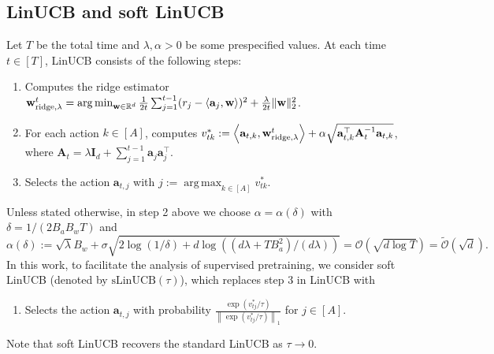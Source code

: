 \documentclass[10pt]{article}
\newcommand{\id}{\bI}
\DeclareMathOperator*{\argmin}{arg\,min}
\DeclareMathOperator*{\argmax}{arg\,max}
\newcommand{\norm}[1]{\left\|{#1}\right\|}
\newcommand{\lone}[1]{\norm{#1}_1}
\renewcommand{\cO}{\mathcal{O}}
\newcommand{\<}{\left\langle}
\renewcommand{\>}{\right\rangle}
\newcommand{\ridge}{{\rm ridge}}
\newcommand{\R}{\mathbb{R}}
\newcommand{\sLinUCB}{{\mathrm{sLinUCB}}}
\newcommand{\temp}{{\tau}}
\newcommand{\cwid}{{\alpha}}
\newcommand{\tcO}{{\tilde{\mathcal O}}}
\newcommand{\totlen}{{T}}
\def\bA{{\mathbf A}}
\def\bI{{\mathbf I}}
\def\ba{{\mathbf a}}
\def\bw{{\mathbf w}}
\begin{document}
\subsection{LinUCB and soft LinUCB}\label{sec:soft-LinUCB}
Let $T$ be the total time and $\lambda,\cwid>0$ be some prespecified values. At each time $t\in[T]$, LinUCB consists of the following steps:
\begin{enumerate}
    \item Computes the ridge estimator $\bw^t_{\ridge,\lambda}=\argmin_{\bw\in\R^d}\frac{1}{2t}\sum_{j=1}^{t-1}(r_j-\<\ba_j,\bw\>)^2+\frac{\lambda}{2t}\|\bw\|_2^2$.
    \item For each action $k\in[A]$, computes $v^*_{tk}:=\<\ba_{t,k},\bw^t_{\ridge,\lambda}\>+\cwid\sqrt{\ba_{t,k}^\top \bA_{t}^{-1}  \ba_{t,k}}$, where $\bA_t=\lambda\id_d+\sum_{j=1}^{t-1}\ba_j\ba_j^\top$.
    \item Selects the action $\ba_{t,j}$ with $j:=\argmax_{k\in[A]}v^*_{tk}$.
\end{enumerate}
Unless stated otherwise, in step 2 above we choose $\alpha=\alpha(\delta)$ with $\delta=1/(2B_aB_wT)$ and $$\cwid(\delta):=\sqrt{\lambda}B_w+\sigma\sqrt{2\log(1/\delta)+d\log((d\lambda+TB_a^2)/(d\lambda))}=\cO(\sqrt{d\log \totlen})=\tcO(\sqrt{d}).$$
In this work, to facilitate the analysis of supervised pretraining, we consider soft LinUCB (denoted by $\sLinUCB(\temp)$), which replaces step 3 in LinUCB with
\begin{enumerate}
    \item [3'] Selects the action $\ba_{t,j}$ with probability $\frac{\exp(v^*_{tj}/\temp)}{\lone{\exp(v^*_{tj}/\temp)}}$ for $j\in[A]$.
\end{enumerate} Note that soft LinUCB recovers the standard LinUCB as $\temp\to0$.
\end{document}
